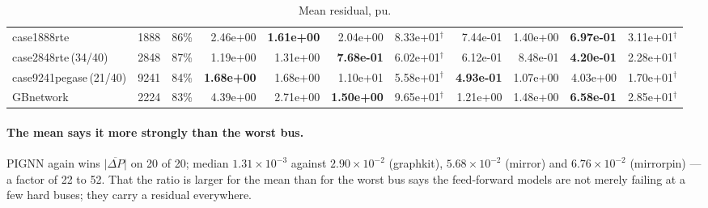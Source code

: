 \documentclass[10pt]{article}
\begin{document}
\begin{landscape}
\begin{table}[H]
\begin{tabular}{lrr rrrr rrrr}
case1888rte & 1888 & 86\% & 2.46e+00 & \textbf{1.61e+00} & 2.04e+00 & 8.33e+01$^\dagger$ & 7.44e-01 & 1.40e+00 & \textbf{6.97e-01} & 3.11e+01$^\dagger$ \\
case2848rte\,(34/40) & 2848 & 87\% & 1.19e+00 & 1.31e+00 & \textbf{7.68e-01} & 6.02e+01$^\dagger$ & 6.12e-01 & 8.48e-01 & \textbf{4.20e-01} & 2.28e+01$^\dagger$ \\
case9241pegase\,(21/40) & 9241 & 84\% & \textbf{1.68e+00} & 1.68e+00 & 1.10e+01 & 5.58e+01$^\dagger$ & \textbf{4.93e-01} & 1.07e+00 & 4.03e+00 & 1.70e+01$^\dagger$ \\
GBnetwork & 2224 & 83\% & 4.39e+00 & 2.71e+00 & \textbf{1.50e+00} & 9.65e+01$^\dagger$ & 1.21e+00 & 1.48e+00 & \textbf{6.58e-01} & 2.85e+01$^\dagger$ \\
\bottomrule
\end{tabular}
\caption{Mean residual, pu.}
\end{table}
\end{landscape}

\paragraph{The mean says it more strongly than the worst bus.} PIGNN again wins
$\overline{|\Delta P|}$ on 20 of 20; median $1.31\times10^{-3}$ against
$2.90\times10^{-2}$ (graphkit), $5.68\times10^{-2}$ (mirror) and
$6.76\times10^{-2}$ (mirrorpin) --- a factor of 22 to 52. That the ratio is
larger for the mean than for the worst bus says the feed-forward models are not
merely failing at a few hard buses; they carry a residual everywhere.
\end{document}
